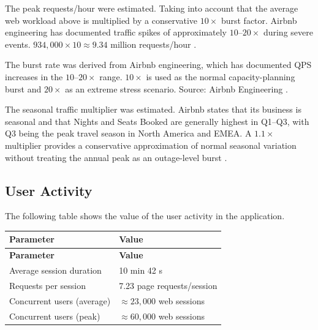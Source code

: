 The peak requests/hour were estimated. Taking into account that the average web workload above is multiplied by a 
conservative $10\times$ burst factor. Airbnb engineering has documented traffic spikes of approximately 
$10$--$20\times$ during severe events. $934{,}000 \times 10 \approx 9.34$ million requests/hour 
\cite{semrush_airbnb_2026,airbnb_engineering_traffic_spikes}.

The burst rate was derived from Airbnb engineering, which has documented QPS increases in the $10$--$20\times$ range. 
$10\times$ is used as the normal capacity-planning burst and $20\times$ as an extreme stress scenario.
Source: Airbnb Engineering \cite{airbnb_engineering_traffic_spikes}.

The seasonal traffic multiplier was estimated. Airbnb states that its business is seasonal and that Nights and 
Seats Booked are generally highest in Q1--Q3, with Q3 being the peak travel season in North America and EMEA. 
A $1.1\times$ multiplier provides a conservative approximation of normal seasonal variation without treating the 
annual peak as an outage-level burst \cite{airbnb_10k_2025}.

\subsection{User Activity}

The following table shows the value of the user activity in the application.

\begin{longtable}{|p{}|p{}|}
    \hline
    \textbf{Parameter} & 
    \textbf{Value} \\
    \hline
    \endfirsthead

    \hline
    \textbf{Parameter} & 
    \textbf{Value} \\
    \hline
    \endhead

    Average session duration & 
    10 min 42 s \cite{semrush_airbnb_2026} \\ 
    \hline 
    
    Requests per session & 
    7.23 page requests/session \cite{semrush_airbnb_2026} \\ 
    \hline 
    
    Concurrent users (average) & 
    $\approx 23{,}000$ web sessions \cite{semrush_airbnb_2026} \\ 
    \hline 
    
    Concurrent users (peak) & 
    $\approx 60{,}000$ web sessions \cite{semrush_airbnb_2026} \\ 
    \hline 
    
\end{longtable}


